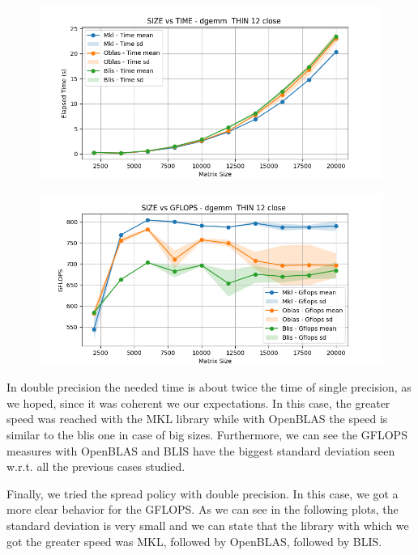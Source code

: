 \documentclass[12pt, titlepage]{report}
\begin{document}
\begin{figure}[H]
    \centering
    \includegraphics[width=\textwidth]{THIN 12/dgemm__THIN_12_close_time.png}
\end{figure}

\begin{figure}[H]
    \centering
    \includegraphics[width=\textwidth]{THIN 12/dgemm__THIN_12_close_gflops.png}
\end{figure}

In double precision the needed time is about twice the time of single precision, as we hoped, since it was coherent we our expectations. In this case, the greater speed was reached with the MKL library while with OpenBLAS the speed is similar to the blis one in case of big sizes. Furthermore, we can see the GFLOPS measures with OpenBLAS and BLIS have the biggest standard deviation seen w.r.t. all the previous cases studied.  

Finally, we tried the spread policy with double precision. In this case, we got a more clear behavior for the GFLOPS. As we can see in the following plots, the standard deviation is very small and we can state that the library with which we got the greater speed was MKL, followed by OpenBLAS, followed by BLIS.  
\end{document}
